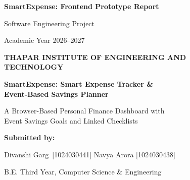 \documentclass[12pt,a4paper]{report}
\begin{document}

\begin{titlepage}
\thispagestyle{empty}

\begin{center}


{\Large \textbf{SmartExpense: Frontend Prototype Report}\par}

\vspace{0.2cm}

{\normalsize Software Engineering Project\par}

\vspace{0.15cm}

{\normalsize Academic Year 2026--2027\par}

\vspace{0.5cm}

{\Large \textbf{THAPAR INSTITUTE OF ENGINEERING AND}\\
\textbf{TECHNOLOGY}\par}

\vspace{0.4cm}

{\Large \textbf{SmartExpense: Smart Expense Tracker \&}\\
\textbf{Event-Based Savings Planner}\par}

\vspace{0.25cm}

{\normalsize
A Browser-Based Personal Finance Dashboard with\\
Event Savings Goals and Linked Checklists
\par}

\vspace{0.7cm}

\textbf{Submitted by:}

\vspace{0.15cm}

 \quad Divanshi Garg\ [1024030441]
 \vspace{0.15cm}
 \quad Navya Arora [1024030438]

\vspace{0.35cm}

B.E. Third Year, Computer Science \& Engineering

\vspace{0.5cm}


\end{center}
\end{titlepage}
\end{document}
